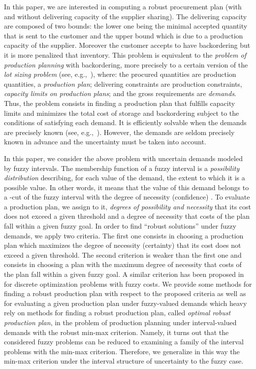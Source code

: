 \documentclass[11pt]{article}
\begin{document}
In this paper, we are interested in  computing
a robust procurement plan (with and without delivering capacity
of the supplier sharing). The delivering capacity are composed of
two bounds: the lower one being  the minimal accepted quantity
that is sent to the customer and the upper bound which is due to a
production capacity of the supplier. Moreover the customer
accepts to have backordering but it is more penalized that
inventory.
This problem is equivalent to the \emph{problem of production
planning} with backordering, more precisely to a certain version of
the \emph{lot sizing problem} (see, e.g.,~\cite{WW58,FLK80}),   where: the procured quantities are
production quantities, a \emph{production plan}; delivering constraints are production
constraints, \emph{capacity limits on production plans}; and the gross requirements are  \emph{demands}.
Thus, the problem consists in
finding a  production plan  that 
fulfills capacity limits and 
 minimizes the total cost of storage and backordering subject to the conditions of satisfying each demand.
It is efficiently
solvable when the demands are precisely
known (see, e.g.,~\cite{DK97,KGW03,AH08}).
However, the demands are seldom precisely known in advance
and the uncertainty must be taken into account.

In this paper, we consider the above problem
with uncertain demands modeled by fuzzy intervals. The membership function
of a fuzzy interval  is a \emph{possibility distribution}
describing, for each value of the demand, the extent
to which it is a possible value. 
In other words, it means that
the value of this demand belongs to a -cut of the fuzzy interval 
with the degree of necessity (confidence)
. 
To evaluate  a production plan, we assign to it,
 \emph{degrees of possibility and
necessity} that  its cost does not exceed a given threshold and
a degree of necessity
that costs of the plan fall within 
a given fuzzy goal.
In order to find ``robust solutions'' under fuzzy demands,
we apply two criteria.
The first one consists in choosing
 a production plan
which maximizes 
the degree of necessity (certainty)   that its cost does not exceed  a given threshold.
The second criterion is
weaker than the first one and consists   
in choosing a plan with
 the maximum degree of necessity
that costs of the plan fall within 
a given fuzzy goal. A similar criterion has been proposed in~\cite{KK09} for
discrete optimization problems with fuzzy costs.
We provide some methods for finding a  robust production plan
 with respect to the proposed criteria as well as for evaluating a given production plan
under fuzzy-valued demands which heavy rely on methods for 
 finding a robust production plan, called 
\emph{optimal robust production plan}, in 
the problem of production
planning under interval-valued demands with the robust  min-max criterion.
Namely,
it turns out that  the considered fuzzy problems can be reduced to examining a family of the interval
problems with the min-max criterion. Therefore, we generalize in this way the  min-max criterion 
under the interval structure of uncertainty to the fuzzy   case.
\end{document}
